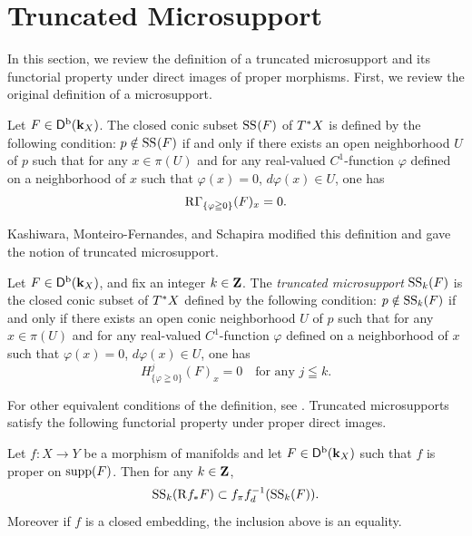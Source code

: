 \section{Truncated Microsupport}\label{sec:t-ss}

In this section, we review 
the definition of a truncated microsupport 
and 
its functorial property under direct images of 
proper morphisms. 
First, we review the original definition 
of a microsupport. 
\begin{Definition+}[{\cite[Definition 5.1.2]{KS90}}]\label{dfn:ss}
  Let \(F\in\Dompb(\kk_X)\). 
  The closed conic subset \(\muS[](F)\) of \(\cotb[X]\) 
  is defined by the following condition: \(p\notin \muS[](F)\) 
  if and only if 
  there exists an open neighborhood \(U\) of \(p\) 
  such that for any \(x\in \pi(U)\) and 
  for any real-valued \(C^{1}\)-function \(\varphi\) 
  defined on a neighborhood of \(x\) such that 
  \(\varphi(x)=0\), \(d\varphi(x)\in U\), 
  one has \begin{equation}
    \RG_{\{\varphi\geqq0\}}(F)_x=0.
  \end{equation}
\end{Definition+}

Kashiwara, Monteiro-Fernandes, 
and Schapira modified
this definition and gave the notion of truncated microsupport.

\begin{Definition+}\label{dfn:t-ss}
  Let \(F\in\Dompb(\kk_X)\), and fix an 
  integer \(k\in\zz\). 
  The \emph{truncated microsupport} \(\muS[k](F)\) is
  the closed conic subset of \(\cotb[X]\) 
  defined by the following condition: 
  \(p\notin \muS[k](F)\) 
  if and only if 
  there exists an open conic neighborhood \(U\) of \(p\) 
  such that for any \(x\in \pi(U)\) and 
  for any real-valued \(C^{1}\)-function \(\varphi\) 
  defined on a neighborhood of \(x\) such that 
  \(\varphi(x)=0\), \(d\varphi(x)\in U\), 
  one has \begin{equation}
    H^{j}_{\{\varphi\geqq0\}}(F)_x=0
    \quad \text{for any \(j\leqq k\).}
  \end{equation}
\end{Definition+}

For other equivalent conditions of 
the definition, see \cite{KMS03a}. 
Truncated microsupports satisfy 
the following functorial property under proper direct images.

\begin{Proposition+}\label{prp:t-push}
  Let \(f\colon X\to Y\) be a morphism of 
  manifolds and let \(F\in\Dompb(\kk_X)\) such that \(f\) is proper on \(\supp(F)\). 
  Then for any \(k\in\zz\), 
  \begin{equation}\label{eq:t-push}
    \muS[k](\Rder{f_{\ast}}F)\subset
    \mpb[f]\mdiff[f]^{-1}(\muS[k](F)).
  \end{equation}
  Moreover if \(f\) is a closed embedding, 
  the inclusion above is an equality.
\end{Proposition+}

